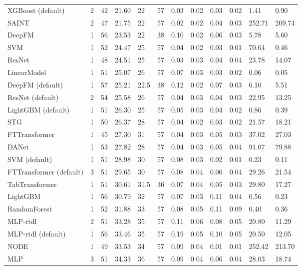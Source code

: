 \begin{tabular}{lllllrllllll}
XGBoost (default) & 2 & 42 & 21.60 & 22 & 57 & 0.03 & 0.02 & 0.03 & 0.02 & 1.41 & 0.90 \\
SAINT & 2 & 47 & 21.75 & 22 & 57 & 0.02 & 0.02 & 0.04 & 0.03 & 252.71 & 209.74 \\
DeepFM & 1 & 56 & 23.53 & 22 & 38 & 0.10 & 0.02 & 0.06 & 0.03 & 5.78 & 5.60 \\
SVM & 1 & 52 & 24.47 & 25 & 57 & 0.04 & 0.02 & 0.03 & 0.01 & 70.64 & 0.46 \\
ResNet & 1 & 48 & 24.51 & 25 & 57 & 0.03 & 0.03 & 0.04 & 0.04 & 23.78 & 14.07 \\
LinearModel & 1 & 51 & 25.07 & 26 & 57 & 0.07 & 0.03 & 0.03 & 0.02 & 0.06 & 0.05 \\
DeepFM (default) & 1 & 57 & 25.21 & 22.5 & 38 & 0.12 & 0.02 & 0.07 & 0.03 & 6.10 & 5.51 \\
ResNet (default) & 2 & 54 & 25.58 & 26 & 57 & 0.04 & 0.03 & 0.04 & 0.03 & 22.95 & 13.25 \\
LightGBM (default) & 1 & 51 & 26.30 & 25 & 57 & 0.05 & 0.03 & 0.04 & 0.02 & 0.86 & 0.39 \\
STG & 1 & 50 & 26.37 & 28 & 57 & 0.04 & 0.02 & 0.03 & 0.02 & 21.57 & 18.21 \\
FTTransformer & 1 & 45 & 27.30 & 31 & 57 & 0.04 & 0.03 & 0.05 & 0.03 & 37.02 & 27.03 \\
DANet & 1 & 53 & 27.82 & 28 & 57 & 0.04 & 0.03 & 0.05 & 0.04 & 91.07 & 79.88 \\
SVM (default) & 1 & 51 & 28.98 & 30 & 57 & 0.08 & 0.03 & 0.02 & 0.01 & 0.23 & 0.11 \\
FTTransformer (default) & 3 & 51 & 29.65 & 30 & 57 & 0.08 & 0.04 & 0.06 & 0.04 & 29.26 & 21.54 \\
TabTransformer & 1 & 51 & 30.61 & 31.5 & 36 & 0.07 & 0.04 & 0.05 & 0.03 & 29.80 & 17.27 \\
LightGBM & 1 & 56 & 30.79 & 32 & 57 & 0.07 & 0.03 & 0.11 & 0.04 & 0.56 & 0.23 \\
RandomForest & 1 & 52 & 31.88 & 33 & 57 & 0.08 & 0.05 & 0.11 & 0.09 & 0.40 & 0.36 \\
MLP-rtdl & 2 & 51 & 33.28 & 35 & 57 & 0.11 & 0.06 & 0.08 & 0.05 & 20.80 & 11.29 \\
MLP-rtdl (default) & 1 & 56 & 33.46 & 35 & 57 & 0.19 & 0.05 & 0.10 & 0.05 & 20.50 & 12.05 \\
NODE & 1 & 49 & 33.53 & 34 & 57 & 0.09 & 0.04 & 0.01 & 0.01 & 252.42 & 213.70 \\
MLP & 3 & 51 & 34.33 & 36 & 57 & 0.09 & 0.04 & 0.06 & 0.04 & 28.03 & 18.74 \\

\end{tabular}

